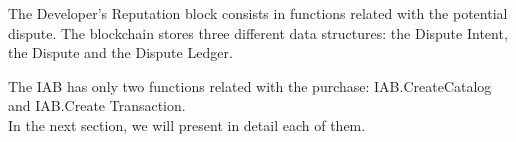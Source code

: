 The Developer's Reputation block consists in functions related with the potential dispute. The 
blockchain stores three different data structures: the Dispute Intent, the Dispute and the Dispute 
Ledger.

The IAB has only two functions related with the purchase: \textsf{IAB.CreateCatalog} and 
\textsf{IAB.Create Transaction}. \\

In the next section, we will present in detail each of them.






%


